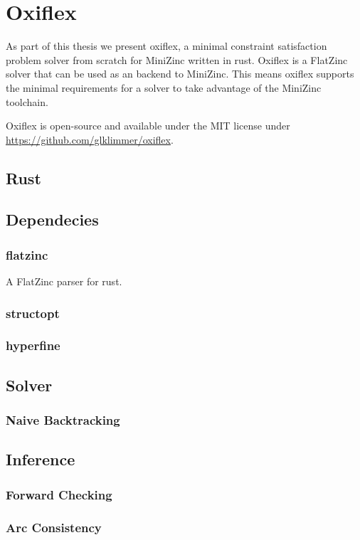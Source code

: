 \chapter{Oxiflex}

As part of this thesis we present oxiflex, a minimal constraint satisfaction problem solver from scratch for MiniZinc written in rust. Oxiflex is a FlatZinc solver that can be used as an backend to MiniZinc. This means oxiflex supports the minimal requirements for a solver to take advantage of the MiniZinc toolchain.

Oxiflex is open-source and available under the MIT license under \url{https://github.com/glklimmer/oxiflex}.

\section{Rust}

\section{Dependecies}

\subsection{flatzinc}

A FlatZinc parser for rust.

\subsection{structopt}

\subsection{hyperfine}

\section{Solver}

\subsection{Naive Backtracking}

\section{Inference}

\subsection{Forward Checking}

\subsection{Arc Consistency}


